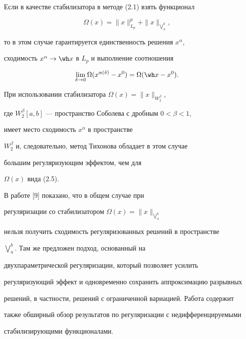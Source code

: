 \begin{notes}


Если в качестве стабилизатора в методе (2.1) взять функционал


\begin{equation}


\Omega (x) = \|x\|^p_{L_p} +


\|x\|_{\bigvee \limits_a^b },


\end{equation}


то в этом случае гарантируется единственность решения $x^{\alpha}$,


сходимость $x^{\alpha} \to \wh x$ в $L_p$ и выполнение соотношения


$$


\lim_{\delta \to 0} \Omega (x^{\alpha(\delta)}-x^0) =


\Omega (\wh x-x^0).


$$


При использовании стабилизатора $\Omega (x) = \|x\|_{W_2^\beta}$,


где $W_2^\beta[a,b]$ --- пространство Соболева с дробным $0<\beta<1$,


имеет место сходимость $x^\alpha$ в пространстве


$W_2^\beta$ и, следовательно, метод Тихонова обладает в этом случае


большим регуляризующим эффектом, чем для


$\Omega (x)$ вида (2.5).


\end{notes}





\begin{notes}


В работе [9] показано, что в общем случае при


регуляризации со стабилизатором $\Omega(x)=\|x\|_{\bigvee\limits_a^b}$


нельзя получить сходимость регуляризованных решений в пространстве


$\bigvee\limits_a^b$. Там же предложен подход, основанный на


двухпараметрической регуляризации, который позволяет усилить


регуляризующий эффект и одновременно сохранить аппроксимацию разрывных


решений, в частности, решений с ограниченной вариацией. Работа содержит


также обширный обзор результатов по регуляризации с недифференцируемыми


стабилизирующими функционалами.


\end{notes}





